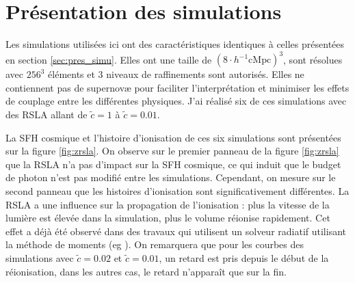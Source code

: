 \section{Présentation des simulations}

Les simulations utilisées ici ont des caractéristiques identiques à celles présentées en section \ref{sec:pres_simu}.
Elles ont une taille de $\left( 8 \cdot h^{-1} \mathrm{cMpc } \right)^3$, sont résolues avec $256^3$ éléments et 3 niveaux de raffinements sont autorisés.
Elles ne contiennent pas de supernovæ pour faciliter l'interprétation et minimiser les effets de couplage entre les différentes physiques.
J'ai réalisé six de ces simulations avec des \ac{RSLA} allant de $\tilde{c}=1$ à $\tilde{c}=0.01$.

La \ac{SFH} cosmique et l'histoire d'ionisation de ces six simulations sont présentées sur la figure \ref{fig:zrsla}.
On observe sur le premier panneau de la figure \ref{fig:zrsla} que la \ac{RSLA} n'a pas d'impact sur la \ac{SFH} cosmique, ce qui induit que le budget de photon n'est pas modifié entre les simulations.
Cependant, on mesure sur le second panneau que les histoires d'ionisation sont significativement différentes.%
La \ac{RSLA} a une influence sur la propagation de l'ionisation : plus la vitesse de la lumière est élevée dans la simulation, plus le volume réionise rapidement.
Cet effet a déjà été observé dans des travaux qui utilisent un solveur radiatif utilisant la méthode de moments (eg \cite{rosdahl_ramsesrt_2013}).
On remarquera que pour les courbes des simulations avec $\tilde{c}=0.02$ et $\tilde{c}=0.01$, un retard est pris depuis le début de la réionisation, dans les autres cas, le retard n’apparaît que sur la fin.


